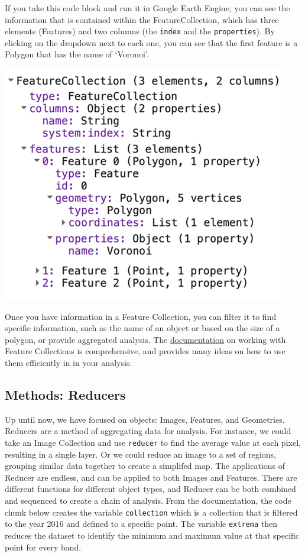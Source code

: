 \documentclass[
]{article}
\begin{document}
If you take this code block and run it in Google Earth Engine, you can see the information that is contained within the FeatureCollection, which has three elements (Features) and two columns (the \texttt{index} and the \texttt{properties}). By clicking on the dropdown next to each one, you can see that the first feature is a Polygon that has the name of `Voronoi'.

\begin{center}\includegraphics[width=0.5\linewidth]{im2} \end{center}

Once you have information in a Feature Collection, you can filter it to find specific information, such as the name of an object or based on the size of a polygon, or provide aggregated analysis. The \href{https://developers.google.com/earth-engine/guides/features}{documentation} on working with Feature Collections is comprehensive, and provides many ideas on how to use them efficiently in in your analysis.

\hypertarget{methods-reducers}{%
\subsection{Methods: Reducers}\label{methods-reducers}}

Up until now, we have focused on objects: Images, Features, and Geometries. Reducers are a method of aggregating data for analysis. For instance, we could take an Image Collection and use \texttt{reducer} to find the average value at each pixel, resulting in a single layer. Or we could reduce an image to a set of regions, grouping similar data together to create a simplifed map. The applications of Reducer are endless, and can be applied to both Images and Features. There are different functions for different object types, and Reducer can be both combined and sequenced to create a chain of analysis. From the documentation, the code chunk below creates the variable \texttt{collection} which is a collection that is filtered to the year 2016 and defined to a specific point. The variable \texttt{extrema} then reduces the dataset to identify the minimum and maximum value at that specific point for every band.
\end{document}

